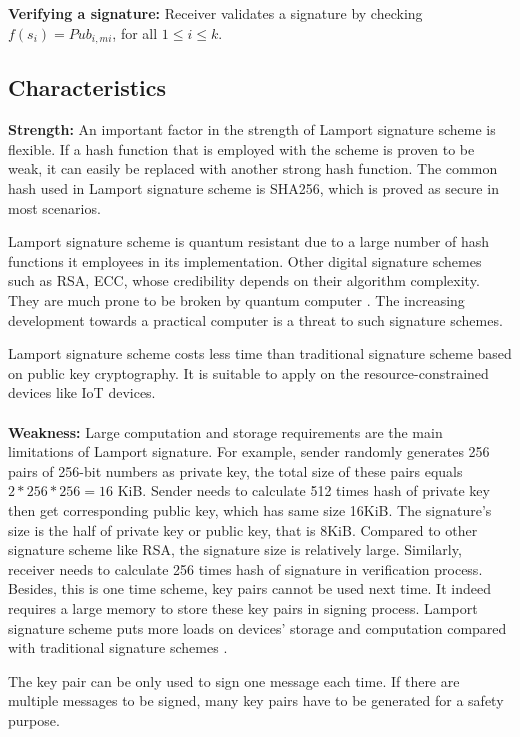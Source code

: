 \documentclass[10pt,sigconf]{acmart}
\begin{document}
\noindent \textbf{Verifying a signature:} \quad Receiver validates a signature by checking $f(s_i)= Pub_{i,mi}$, for all $1 \leq i \leq k$.

\subsection{Characteristics}

\textbf{Strength:} \quad An important factor in the strength of Lamport signature scheme is flexible. If a hash function that is employed with the scheme is proven to be weak, it can easily be replaced with another strong hash function. The common hash used in Lamport signature scheme is SHA256, which is proved as secure in most scenarios.

Lamport signature scheme is quantum resistant due to a large number of hash functions it employees in its implementation. Other digital signature schemes such as RSA, ECC, whose credibility depends on their algorithm complexity. They are much prone to be broken by quantum computer \cite{8346359}. The increasing development towards a practical computer is a threat to such signature schemes.

Lamport signature scheme costs less time than traditional signature scheme based on public key cryptography. It is suitable to apply on the resource-constrained devices like IoT devices.
\\
\\
\noindent \textbf{Weakness:} \quad Large computation and storage requirements are the main limitations of Lamport signature. For example, sender randomly generates 256 pairs of 256-bit numbers as private key, the total size of these pairs equals $2*256*256=16$ KiB. Sender needs to calculate 512 times hash of private key then get corresponding public key, which has same size 16KiB. The signature's size is the half of private key or public key, that is 8KiB. Compared to other signature scheme like RSA, the signature size is relatively large. Similarly, receiver needs to calculate 256 times hash of signature in verification process. Besides, this is one time scheme, key pairs cannot be used next time. It indeed requires a large memory to store these key pairs in signing process. Lamport signature scheme puts more loads on devices' storage and computation compared with traditional signature schemes \cite{8402796}.

The key pair can be only used to sign one message each time. If there are multiple messages to be signed, many key pairs have to be generated for a safety purpose. 
\end{document}
